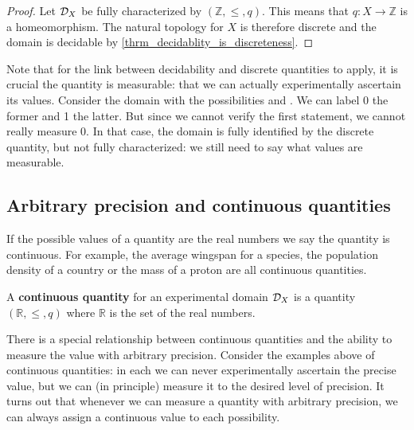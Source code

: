 \documentclass[11pt,letterpaper,fleqn]{memoir} %
\begin{document}
\begin{mathSection}
\begin{proof}
		Let $\mathcal{D}_X$ be fully characterized by $(\mathbb{Z}, \leq, q)$. This means that $q : X \to \mathbb{Z}$ is a homeomorphism. The natural topology for $X$ is therefore discrete and the domain is decidable by \ref{thrm_decidablity_is_discreteness}.
	\end{proof}	
	
\end{mathSection}

Note that for the link between decidability and discrete quantities to apply, it is crucial the quantity is measurable: that we can actually experimentally ascertain its values. Consider the domain with the possibilities  and . We can label 0 the former and 1 the latter. But since we cannot verify the first statement, we cannot really measure 0. In that case, the domain is fully identified by the discrete quantity, but not fully characterized: we still need to say what values are measurable.

\subsection{Arbitrary precision and continuous quantities}

If the possible values of a quantity are the real numbers we say the quantity is continuous. For example, the average wingspan for a species, the population density of a country or the mass of a proton are all continuous quantities.

\begin{mathSection}
	\begin{defn}
		A \textbf{continuous quantity} for an experimental domain $\mathcal{D}_X$ is a quantity $(\mathbb{R}, \leq, q)$ where $\mathbb{R}$ is the set of the real numbers.
	\end{defn}
\end{mathSection}

There is a special relationship between continuous quantities and the ability to measure the value with arbitrary precision. Consider the examples above of continuous quantities: in each we can never experimentally ascertain the precise value, but we can (in principle) measure it to the desired level of precision. It turns out that whenever we can measure a quantity with arbitrary precision, we can always assign a continuous value to each possibility.
\end{document}

